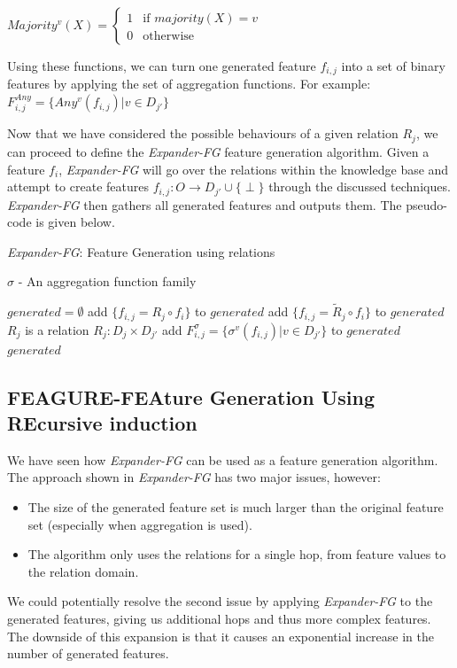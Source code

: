\documentclass{article}
\theoremstyle{definition}
\begin{document}
$Majority^v(X)=\begin{cases} 1 &\mbox{if } majority(X)=v
\\ 
0 & \mbox{otherwise } \end{cases}$

Using these functions, we can turn one generated feature $f_{i,j}$ into a set of binary features by applying the set of aggregation functions. For example:  $F_{i,j}^{Any}=\{Any^v(f_{i,j})|v\in D_{j'}\}$

Now that we have considered the possible behaviours of a given relation $R_j$, we can proceed to define the \emph{Expander-FG} feature generation algorithm. Given a feature $f_i$, \emph{Expander-FG} will go over the relations within the knowledge base and attempt to create features $f_{i,j}:O\rightarrow D_{j'}\cup\{\perp\}$ through the discussed techniques. \emph{Expander-FG} then gathers all generated features and outputs them. The pseudo-code is given below.

\begin{algorithm}[H]
	\caption{\emph{Expander-FG}: Feature Generation using relations}
	\label{code-compete}
	\small
	$\sigma$ - An aggregation function family
	\begin{algorithmic}
		\State $generated=\emptyset$
		\State add $\{f_{i,j}=R_j\circ f_i\}$ to $generated$
		\State add $\{f_{i,j}=\tilde{R}_j\circ f_i\}$ to $generated$
		\EndIf
		\Else \Comment $R_j$ is a relation $R_j:D_j\times D_{j'}$
		\State add $F^\sigma_{i,j}=\{\sigma^v(f_{i,j})|v\in D_{j'}\}$ to $generated$
		\EndIf
		\EndIf
		\EndFor
		\EndFor
		\State \Return $generated$ 
		\EndFunction
		
	\end{algorithmic}
\end{algorithm}

\subsection{FEAGURE-FEAture Generation Using REcursive induction}
\label{algorithm_section}

We have seen how \emph{Expander-FG} can be used as a feature generation algorithm.
The approach shown in \emph{Expander-FG} has two major issues, however:
\begin{itemize}
	\item The size of the generated feature set is much larger than the original feature set (especially when aggregation is used).
	\item The algorithm only uses the relations for a single hop, from feature values to the relation domain.
\end{itemize}
We could potentially resolve the second issue by applying \emph{Expander-FG} to the generated features, giving us additional hops and thus more complex features. The downside of this expansion is that it causes an exponential increase in the number of generated features.
\end{document}
